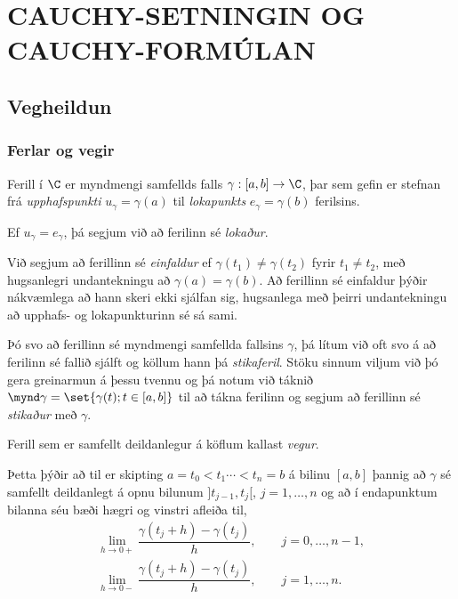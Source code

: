 \chapter {CAUCHY-SETNINGIN OG CAUCHY-FORMÚLAN}
 

\section
{Vegheildun}

\subsection*{Ferlar og vegir}


Ferill í  $\C$ er myndmengi samfellds falls $\gamma:[a,b]\to \C$, þar
sem gefin er stefnan frá {\it
upphafspunkti} $u_\gamma=\gamma(a)$
til {\it lokapunkts} $e_\gamma=\gamma(b)$ ferilsins.  

Ef $u_\gamma=e_\gamma$, þá segjum við að ferilinn sé {\it
lokaður}. 

Við
segjum að ferillinn sé {\it einfaldur}  ef
$\gamma(t_1)\neq \gamma(t_2)$ fyrir $t_1\neq t_2$, með hugsanlegri
undantekningu að $\gamma(a)=\gamma(b)$.   Að ferillinn sé einfaldur
þýðir nákvæmlega að hann skeri ekki sjálfan sig, hugsanlega með þeirri
undantekningu að upphafs- og lokapunkturinn sé sá sami. 


Þó svo að
ferillinn sé myndmengi samfellda fallsins $\gamma$, þá lítum við
oft svo á að ferilinn sé fallið sjálft og köllum hann þá {\it
stikaferil}.    Stöku sinnum viljum við þó
gera greinarmun á þessu tvennu og þá notum við táknið 
$\mynd \gamma=\set{\gamma(t); t\in [a,b]}$ til að
tákna ferilinn og segjum að ferillinn sé {\it stikaður} með 
$\gamma$. 


\noindent
Ferill sem er samfellt deildanlegur á köflum kallast {\it
vegur}.

Þetta þýðir að til er skipting $a=t_0<t_1\cdots<t_n=b$ á bilinu
$[a,b]$ þannig að $\gamma$ sé samfellt deildanlegt á opnu bilunum
$]t_{j-1},t_j[$, $j=1,\dots, n$ og að í endapunktum bilanna séu bæði
hægri og vinstri afleiða til,
\begin{gather*}
\lim_{h\to 0+}\dfrac{\gamma(t_j+h)-\gamma(t_j)}h, \qquad
j=0,\dots,n-1,\\ 
\lim_{h\to 0-}\dfrac{\gamma(t_j+h)-\gamma(t_j)}h, \qquad
j=1,\dots,n.
\end{gather*}

